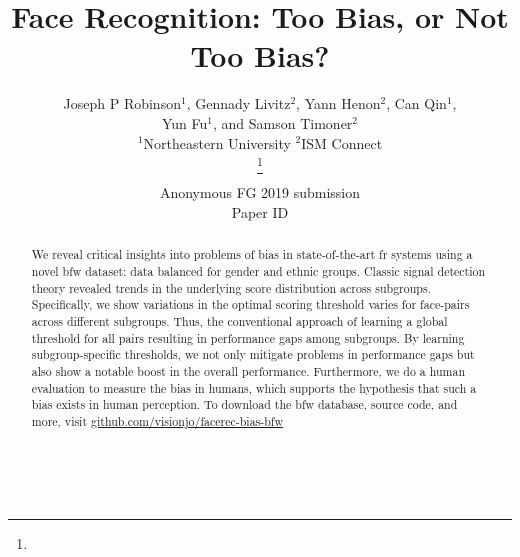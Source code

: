 \documentclass[a4paper, 10pt, conference]{ieeeconf}      %
\title{\LARGE \bf\vspace{-10mm}
Face Recognition: Too Bias, or Not Too Bias?
}
\author{\parbox{16cm}{\centering
    {\large Joseph P Robinson$^1$, Gennady Livitz$^2$, Yann Henon$^2$, Can Qin$^1$,\\ Yun Fu$^1$, and Samson Timoner$^2$}\\
    {\normalsize
    \hspace{-.4in}$^{1}$Northeastern University\hspace{.7in} $^{2}$ISM Connect}}
    \thanks{}%
}
\begin{document}


\def\angle{0}
\def\radius{3}
\def\cyclelist{{"orange","blue","red","green","magenta","cyan"}}
\newcount\cyclecount {}
\newcount\ind {}

\ifFGfinal
\thispagestyle{empty}
\pagestyle{empty}
\else
\author{Anonymous FG 2019 submission\\ Paper ID \FGPaperID \\}
\pagestyle{plain}
\fi
\maketitle


\begin{abstract}
We reveal critical insights into problems of bias in state-of-the-art \gls{fr} systems using a novel \gls{bfw} dataset: data balanced for gender and ethnic groups. Classic signal detection theory revealed trends in the underlying score distribution across subgroups. Specifically, we show variations in the optimal scoring threshold varies for face-pairs across different subgroups. Thus, the conventional approach of learning a  global threshold for all pairs resulting in performance gaps among subgroups. By learning subgroup-specific thresholds, we not only mitigate problems in performance gaps but also show a notable boost in the overall performance. Furthermore, we do a human evaluation to measure the bias in humans, which supports the hypothesis that such a bias exists in human perception. To download the \gls{bfw} database, source code, and more, visit \href{https://github.com/visionjo/facerec-bias-bfw}{github.com/visionjo/facerec-bias-bfw}
\end{abstract}
\


















\end{document}
